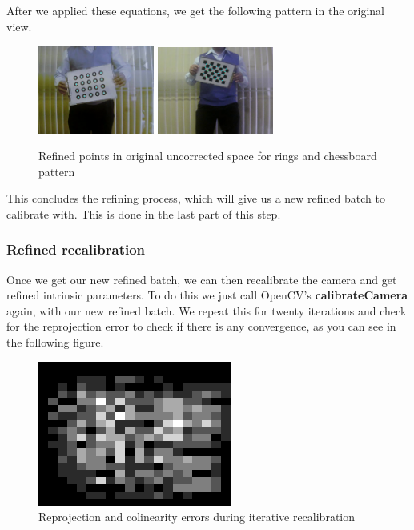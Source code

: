 \documentclass[journal]{IEEEtran}
\begin{document}
\begin{itemize}
        After we applied these equations, we get the following pattern in the original view.

        \begin{figure}[H]
        \centering
        \includegraphics[width=1.5in]{_img/report_4/img_refinement_distortion.png}
        \includegraphics[width=1.5in]{_img/report_4/img_refinement_distortion_chessboard.png}
        \caption{Refined points in original uncorrected space for rings and chessboard pattern}
        \end{figure}   

        This concludes the refining process, which will give us a new refined batch to calibrate with. This is done in the last part of this step.

\end{itemize}

\subsubsection{ \textbf{ Refined recalibration } }

Once we get our new refined batch, we can then recalibrate the camera and get refined intrinsic parameters. To do this we just call OpenCV's \textbf{calibrateCamera} again, with our new refined batch. We repeat this for twenty iterations and check for the reprojection error to check if there is any convergence, as you can see in the following figure.

\begin{figure}[H]
\centering
\includegraphics[width=2.5in]{_img/img_report3_heatmap.png}
\caption{Reprojection and colinearity errors during iterative recalibration}
\end{figure}   
\end{document}

